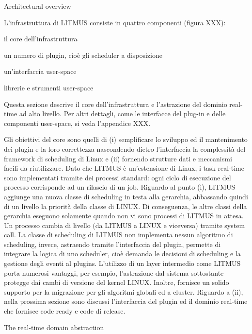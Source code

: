 Architectural overview

L'infrastruttura di LITMUS consiste in quattro componenti (figura XXX):

\item il core dell'infrastruttura
\item un numero di plugin, cioè gli scheduler a disposizione
\item un'interfaccia user-space
\item librerie e strumenti user-space

Questa sezione descrive il core dell'infrastruttura e l'astrazione del dominio real-time ad alto livello. Per altri dettagli, come le interfacce del plug-in e delle componenti user-space, si veda l'appendice XXX.

Gli obiettivi del core sono quelli di (i) semplificare lo sviluppo ed il mantenimento dei plugin e la loro correttezza nascondendo dietro l'interfaccia la complessità del framework di scheduling di Linux e (ii) fornendo strutture dati e meccanismi facili da riutilizzare. Dato che LITMUS è un'estensione di Linux, i task real-time sono implementati tramite dei processi standard: ogni ciclo di esecuzione del processo corrisponde ad un rilascio di un job. 
Riguardo al punto (i), LITMUS aggiunge una nuova classe di scheduling in testa alla gerarchia, abbassando quindi di un livello la priorità della classe di LINUX. Di conseguenza, le altre classi della gerarchia eseguono solamente quando non vi sono processi di LITMUS in attesa. Un processo cambia di livello (da LITMUS a LINUX e viceversa) tramite system call.
La classe di scheduling di LITMUS non implementa nessun algoritmo di scheduling, invece, astraendo tramite l'interfaccia del plugin, permette di integrare la logica di uno scheduler, cioè demanda le decisioni di scheduling e la gestione degli eventi al plugins.
L'utilizzo di un layer intermedio come LITMUS porta numerosi vantaggi, per esempio, l'astrazione dal sistema sottostante protegge dai cambi di versione del kernel LINUX. Inoltre, fornisce un solido supporto per la migrazione per gli algoritmi globali ed a cluster.
Riguardo a (ii), nella prossima sezione sono discussi l'interfaccia del plugin ed il dominio real-time che fornisce code ready e code di release.

The real-time domain abstraction

